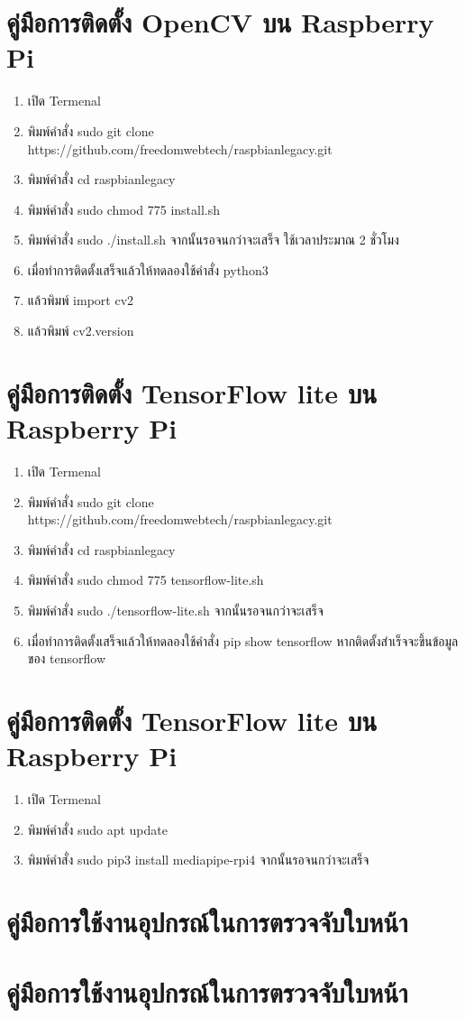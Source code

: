 \section{คู่มือการติดตั้ง OpenCV บน Raspberry Pi}
\begin{enumerate}
  \item เปิด Termenal
  \item พิมพ์คำสั่ง sudo git clone https://github.com/freedomwebtech/raspbianlegacy.git
  \item พิมพ์คำสั่ง cd raspbianlegacy
  \item พิมพ์คำสั่ง sudo chmod 775 install.sh
  \item พิมพ์คำสั่ง sudo ./install.sh จากนั้นรอจนกว่าจะเสร็จ ใช้เวลาประมาณ 2 ชั่วโมง
  \item เมื่อทำการติดตั้งเสร็จแล้วให้ทดลองใช้คำสั่ง python3
  \item แล้วพิมพ์ import cv2
  \item แล้วพิมพ์ cv2.\textunderscore\textunderscore version \textunderscore\textunderscore
\end{enumerate}

\section{คู่มือการติดตั้ง TensorFlow lite บน Raspberry Pi}
\begin{enumerate}
  \item เปิด Termenal
  \item พิมพ์คำสั่ง sudo git clone https://github.com/freedomwebtech/raspbianlegacy.git
  \item พิมพ์คำสั่ง cd raspbianlegacy
  \item พิมพ์คำสั่ง sudo chmod 775 tensorflow-lite.sh
  \item พิมพ์คำสั่ง sudo ./tensorflow-lite.sh จากนั้นรอจนกว่าจะเสร็จ
  \item เมื่อทำการติดตั้งเสร็จแล้วให้ทดลองใช้คำสั่ง pip show tensorflow หากติดตั้งสำเร็จจะขึ้นข้อมูลของ tensorflow
\end{enumerate}

\section{คู่มือการติดตั้ง TensorFlow lite บน Raspberry Pi}
\begin{enumerate}
  \item เปิด Termenal
  \item พิมพ์คำสั่ง sudo apt update
  \item พิมพ์คำสั่ง sudo pip3 install mediapipe-rpi4 จากนั้นรอจนกว่าจะเสร็จ
\end{enumerate}

\section{คู่มือการใช้งานอุปกรณ์ในการตรวจจับใบหน้า}



\section{คู่มือการใช้งานอุปกรณ์ในการตรวจจับใบหน้า}
